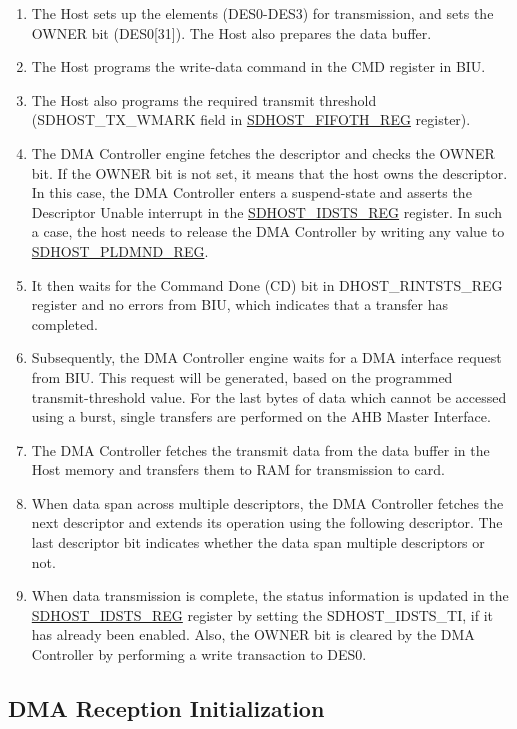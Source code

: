 \documentclass[main\_\_EN.tex]{subfiles}
\begin{document}
\begin{enumerate}
\item The Host sets up the elements (DES0-DES3) for transmission, and sets the OWNER bit (DES0[31]). The Host also prepares the data buffer.
\item The Host programs the write-data command in the CMD register in BIU.
\item The Host also programs the required transmit threshold  (SDHOST\_TX\_WMARK field in \hyperref[regdesc:FIFOTHREG]{SDHOST\_FIFOTH\_REG} register).
\item The DMA Controller engine fetches the descriptor and checks the OWNER bit. If the OWNER bit is not set, it means that the host owns the descriptor. In this case, the DMA Controller enters a suspend-state and asserts the Descriptor Unable interrupt in the \hyperref[regdesc:IDSTSREG]{SDHOST\_IDSTS\_REG} register. In such a case, the host needs to release the DMA Controller by writing any value to \hyperref[regdesc:PLDMNDREG]{SDHOST\_PLDMND\_REG}.
\item It then waits for the Command Done (CD) bit in DHOST\_RINTSTS\_REG register and no errors from BIU, which indicates that a transfer has completed.
\item Subsequently, the DMA Controller engine waits for a DMA interface request from BIU. This request will be generated, based on the programmed transmit-threshold value. For the last bytes of data which cannot be accessed using a burst, single transfers are performed on the AHB Master Interface.
\item The DMA Controller fetches the transmit data from the data buffer in the Host memory and transfers them to RAM for transmission to card.
\item When data span across multiple descriptors, the DMA Controller fetches the next descriptor and extends its operation using the following descriptor. The last descriptor bit indicates whether the data span multiple descriptors or not.
\item When data transmission is complete, the status information is updated in the \hyperref[regdesc:IDSTSREG]{SDHOST\_IDSTS\_REG} register by setting the SDHOST\_IDSTS\_TI, if it has already been enabled. Also, the OWNER bit is cleared by the DMA Controller by performing a write transaction to DES0.
\end{enumerate}

\subsection{DMA Reception Initialization}
\end{document}
